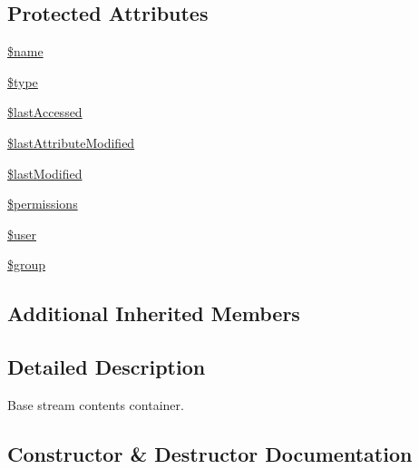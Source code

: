 \subsection*{Protected Attributes}
\begin{DoxyCompactItemize}
\item 
\mbox{\hyperlink{classorg_1_1bovigo_1_1vfs_1_1vfs_stream_abstract_content_ab2fc40d43824ea3e1ce5d86dee0d763b}{\$name}}
\item 
\mbox{\hyperlink{classorg_1_1bovigo_1_1vfs_1_1vfs_stream_abstract_content_a9a4a6fba2208984cabb3afacadf33919}{\$type}}
\item 
\mbox{\hyperlink{classorg_1_1bovigo_1_1vfs_1_1vfs_stream_abstract_content_a235445ed4b9da7c0bdca21df7697f375}{\$last\+Accessed}}
\item 
\mbox{\hyperlink{classorg_1_1bovigo_1_1vfs_1_1vfs_stream_abstract_content_a3f414195d287c0d5608b098fae0a879e}{\$last\+Attribute\+Modified}}
\item 
\mbox{\hyperlink{classorg_1_1bovigo_1_1vfs_1_1vfs_stream_abstract_content_a6ab0d97ce9c68912add86fba1acc87aa}{\$last\+Modified}}
\item 
\mbox{\hyperlink{classorg_1_1bovigo_1_1vfs_1_1vfs_stream_abstract_content_abbf3a7a4bf2c5133e7bca892a6223c1a}{\$permissions}}
\item 
\mbox{\hyperlink{classorg_1_1bovigo_1_1vfs_1_1vfs_stream_abstract_content_a598ca4e71b15a1313ec95f0df1027ca5}{\$user}}
\item 
\mbox{\hyperlink{classorg_1_1bovigo_1_1vfs_1_1vfs_stream_abstract_content_ad530a85733b0ec1dc321859fd8faa0dc}{\$group}}
\end{DoxyCompactItemize}
\subsection*{Additional Inherited Members}


\subsection{Detailed Description}
Base stream contents container. 

\subsection{Constructor \& Destructor Documentation}
\mbox{\label{classorg_1_1bovigo_1_1vfs_1_1vfs_stream_abstract_content_acb8ea4ab5eedb93ea03a6628f5915f04}} 
